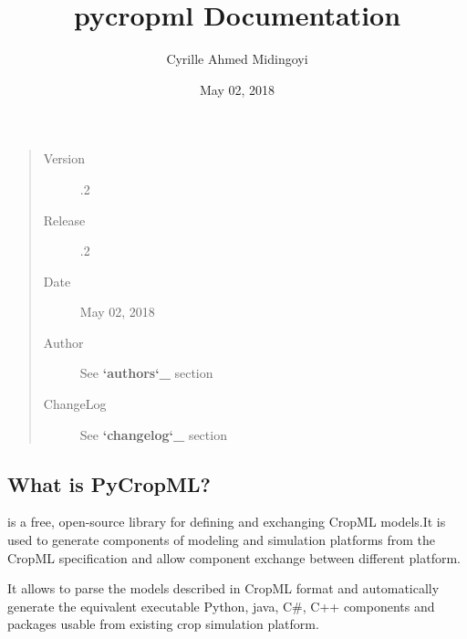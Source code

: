 \documentclass[letterpaper,10pt,english]{sphinxmanual}
\title{pycropml Documentation}
\date{May 02, 2018}
\author{Cyrille Ahmed Midingoyi}
\begin{document}
\maketitle
\sphinxtableofcontents
{}\label{\detokenize{index::doc}}



\chapter{}
\label{\detokenize{index:welcome-to-pycropml-documentation}}\label{\detokenize{index:contents}}
\begin{sphinxShadowBox}
\begin{quote}\begin{description}
\item[{Version}] .2

\item[{Release}] .2

\item[{Date}] \leavevmode
May 02, 2018

\item[{Author}] \leavevmode
See {\color{red}\bfseries{}{}`authors{}`\_} section

\item[{ChangeLog}] \leavevmode
See {\color{red}\bfseries{}{}`changelog{}`\_} section

\end{description}\end{quote}
\end{sphinxShadowBox}


\section{What is PyCropML?}
\label{\detokenize{user/overview:what-is-pycropml}}\label{\detokenize{user/overview::doc}}
\begin{DUlineblock}{0em}
\item[]  is a free, open-source library for defining
and exchanging CropML models.It is used to generate components
of modeling and simulation platforms from the CropML specification and
allow component exchange between different platform.
\item[] It allows to parse the models described in CropML format
and automatically generate the equivalent executable Python, java, C\#, C++ components
and packages usable from existing crop simulation platform.
\end{DUlineblock}
\end{document}
